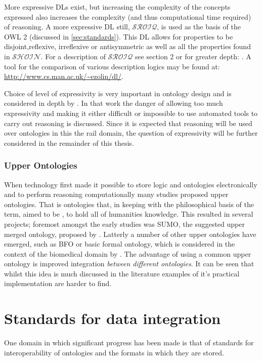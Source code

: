 More expressive DLs exist, but increasing the complexity of the concepts expressed also increases the complexity (and thus computational time required) of reasoning. A more expressive DL still, \(\mathcal{SROIQ}\), is used as the basis of the OWL 2 (discussed in \autoref{sec:standards}). This DL allows for properties to be disjoint,reflexive, irreflexive or antisymmetric as well as all the properties found in \(\mathcal{SHOIN}\). For a description of \(\mathcal{SROIQ}\) see \citet{Horridge2012} section 2 or for greater depth: \citet{Horrocks2006}. A tool for the comparison of various description logics may be found at: \url{http://www.cs.man.ac.uk/~ezolin/dl/}.

Choice of level of expressivity is very important in ontology design and is considered in depth by \citet{Tutcher2015}. In that work the danger of allowing too much expressivity and making it either difficult or impossible to use automated tools to carry out reasoning is discussed. Since it is expected that reasoning will be used over ontologies in this the rail domain, the question of expressivity will be further considered in the remainder of this thesis.

\subsubsection{Upper Ontologies}
When technology first made it possible to store logic and ontologies electronically and to perform reasoning computationally many studies proposed upper ontologies. That is ontologies that, in keeping with the philosophical basis of the term, aimed to be , to hold all of humanities knowledge. This resulted in several projects; foremost amongst the early studies was SUMO, the suggested upper merged ontology, proposed by \cite{Niles2001}. Latterly a number of other upper ontologies have emerged, such as  BFO or basic formal ontology, which is considered in the context of the biomedical domain by \citet{Grenon2004}. The advantage of using a common upper ontology is improved integration \emph{between different ontologies}. It can be seen that whilst this idea is much discussed in the literature examples of it's practical implementation are harder to find.

\section{Standards for data integration}\label{sec:standards}
One domain in which significant progress has been made is that of standards for interoperability of ontologies and the formats in which they are stored.

